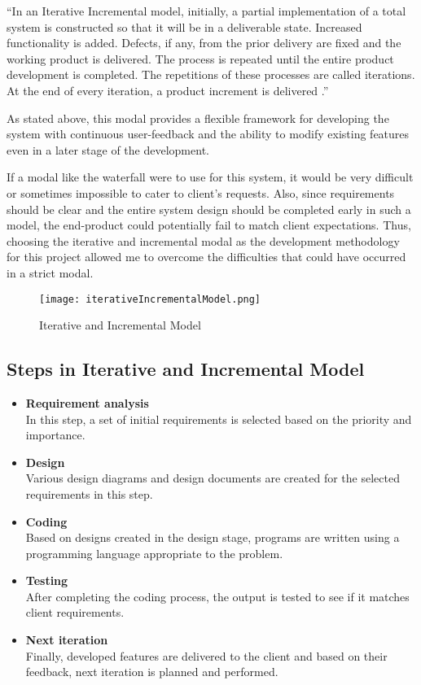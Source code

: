 \documentclass[12pt]{report}
\begin{document}
``In an Iterative Incremental model, initially, a partial implementation of a total system is constructed so that it will be in a deliverable state. Increased functionality is added. Defects, if any, from the prior delivery are fixed and the working product is delivered. The process is repeated until the entire product development is completed. The repetitions of these processes are called iterations. At the end of every iteration, a product increment is delivered \cite{tpoint_2019_iterative_incremental}.''

As stated above, this modal provides a flexible framework for developing the system with continuous user-feedback and the ability to modify existing features even in a later stage of the development.

If a modal like the waterfall were to use for this system, it would be very difficult or sometimes impossible to cater to client's requests. Also, since requirements should be clear and the entire system design should be completed early in such a model, the end-product could potentially fail to match client expectations. Thus, choosing the iterative and incremental modal as the development methodology for this project allowed me to overcome the difficulties that could have occurred in a strict modal.

\begin{figure}[H]
	\centering
	\texttt{[image: iterativeIncrementalModel.png]}
	\caption{Iterative and Incremental Model}
\end{figure}

\subsection{Steps in Iterative and Incremental Model}
\begin{itemize}
	\item {\bf{Requirement analysis}}\\
	      In this step, a set of initial requirements is selected based on the priority and importance.

	\item {\bf{Design}}\\
	      Various design diagrams and design documents are created for the selected requirements in this step.

	\item {\bf{Coding}}\\
	      Based on designs created in the design stage, programs are written using a programming language appropriate to the problem.

	\item {\bf{Testing}}\\
	      After completing the coding process, the output is tested to see if it matches client requirements.

	\item {\bf{Next iteration}}\\
	      Finally, developed features are delivered to the client and based on their feedback, next iteration is planned and performed.

\end{itemize}
\end{document}

